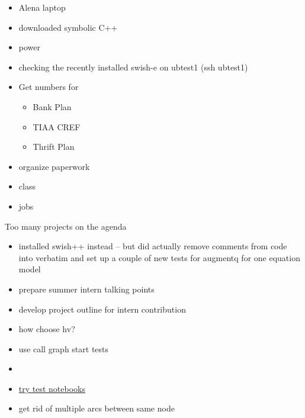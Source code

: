 \documentclass[hyperref]{labbook}
\begin{document}
\begin{itemize}
\item Alena laptop
\item downloaded symbolic C++
\item power 
\item checking the recently installed swish-e on ubtest1   (ssh ubtest1)  
\end{itemize}

\begin{itemize}
\item Get numbers for 
  \begin{itemize}
  \item Bank Plan
  \item TIAA CREF
  \item Thrift Plan
  \end{itemize}
\item organize paperwork
\end{itemize}

\begin{itemize}
\item class
\item jobs
\end{itemize}



Too many projects on the agenda

\begin{itemize}
\item installed swish++ instead -- but did actually remove comments from code into verbatim and set up a couple of new tests for augmentq for one equation model
\end{itemize}

\begin{itemize}
\item prepare summer intern talking points
\item develop project outline for intern contribution
\item how choose hv?
\end{itemize}

\begin{itemize}
\item use  call graph start  tests 
\item \item \href{http://mathematica.stackexchange.com/questions/54594/how-to-use-the-testing-notebook-to-test-a-package}{try test notebooks}
\item get rid of multiple arcs between same node
\end{itemize}
\end{document}
